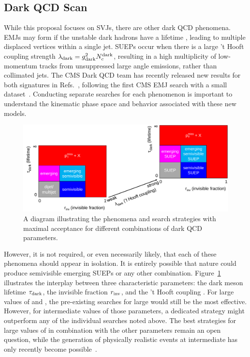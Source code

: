 \subsection{Dark QCD Scan}\label{subsec:darkscan}

While this proposal focuses on SVJs, there are other dark QCD phenomena.
EMJs may form if the unstable dark hadrons have a lifetime \taudark, leading to multiple displaced vertices within a single jet.
SUEPs occur when there is a large 't Hooft coupling strength $\lambda_\text{dark} = g_{\mathrm{dark}}^2 N_{c}^{\text{dark}}$,
resulting in a high multiplicity of low-momentum tracks from unsuppressed large angle emissions, rather than collimated jets.
The CMS Dark QCD team has recently released new results for both signatures in Refs.~\cite{CMS:2023vpb,CMS:2024emj},
following the first CMS EMJ search with a small dataset~\cite{Sirunyan:2018njd}.
Conducting separate searches for each phenomenon is important to understand the kinematic phase space and behavior associated with these new models.

\begin{figure}[bht]
\centering
\includegraphics[width=0.95\myfigurewidth]{figures/svj_acceptance_diagram_v7.pdf}
\caption{A diagram illustrating the phenomena and search strategies with maximal acceptance for different combinations of dark QCD parameters.}
\label{fig:svjacc}
\end{figure}

However, it is not required, or even necessarily likely, that each of these phenomena should appear in isolation.
It is entirely possible that nature could produce semivisible emerging SUEPs or any other combination.
Figure~\ref{fig:svjacc} illustrates the interplay between three characteristic parameters:
the dark meson lifetime $\tau_\text{dark}$, the invisible fraction $r_{\mathrm{inv}}$, and the 't Hooft coupling \thooft.
For large values of \rinv and \taudark, the pre-existing searches for large \met would still be the most effective.
However, for intermediate values of those parameters, a dedicated strategy might outperform any of the individual searches noted above.
The best strategies for large values of \thooft in combination with the other parameters remain an open question,
while the generation of physically realistic events at intermediate \thooft has only recently become possible~\cite{Cesarotti:2020uod}.

